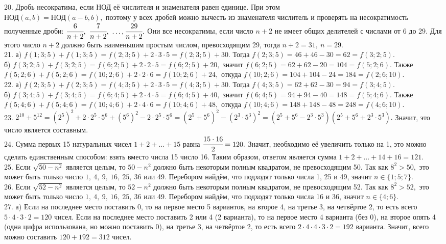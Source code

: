 20. Дробь несократима, если НОД её числителя и знаменателя равен единице. При этом\\ НОД$(a,b)=$НОД$(a-b,b),$ поэтому у всех дробей можно вычесть из знаменателя числитель и проверять на несократимость полученные дроби: $\cfrac{6}{n+2},\ \cfrac{7}{n+2},\ \ldots, \cfrac{29}{n+2}.$ Они все несократимы, если число $n+2$ не имеет общих делителей с числами от 6 до 29. Для этого число $n+2$ должно быть наименьшим простым числом, превосходящим 29, тогда $n+2=31,\ n=29.$\\
21. а) $f(1;3;5)+f(1;3;5)=f(2;3;5)+2\cdot3\cdot5=f(2;3;5)+30.$ Тогда $f(2;3;5)=46+46-30=62=f(3;2;5).$\\
б) $f(3;2;5)+f(3;2;5)=f(6;2;5)+2\cdot2\cdot5=f(6;2;5)+20,$ значит $f(6;2;5)=62+62-20=104=f(5;2;6).$ Также
$f(5;2;6)+f(5;2;6)=f(10;2;6)+2\cdot2\cdot6=f(10;2;6)+24,$ откуда $f(10;2;6)=104+104-24=184=f(2;6;10).$\\
22. а) $f(2;3;5)+f(2;3;5)=f(4;3;5)+2\cdot3\cdot5=f(4;3;5)+30.$ Тогда $f(4;3;5)=62+62-30=94=f(3;4;5).$\\
б) $f(3;4;5)+f(3;4;5)=f(6;4;5)+2\cdot4\cdot5=f(6;4;5)+40,$ значит $f(6;4;5)=94+94-40=148=f(5;4;6).$ Также
$f(5;4;6)+f(5;4;6)=f(10;4;6)+2\cdot4\cdot6=f(10;4;6)+48,$ откуда $f(10;4;6)=148+148-48=248=f(4;6;10).$\\
23. $2^{10}+5^{12}=(2^5)^2+2\cdot2^5\cdot5^6+(5^6)^2-2\cdot2^5\cdot5^6=(2^5+5^6)^2-(2^3\cdot5^3)^2=
(2^5+5^6-2^3\cdot5^3)(2^5+5^6+2^3\cdot5^3).$ Значит, это число является составным.\\
24. Сумма первых 15 натуральных чисел $1+2+\ldots+15$ равна $\cfrac{15\cdot16}{2}=120.$ Значит, необходимо её увеличить только на 1, это можно сделать единственным способом: взять вместо числа 15 число 16. Таким образом, ответом является сумма $1+2+\ldots+14+16=121.$\\
25. Если $\sqrt{50-n^2}$ является целым, то $50-n^2$ должно быть некоторым полным квадратом, не превосходящим 50. Так как $8^2>50,$ это может быть только число $1,\ 4,\ 9,\ 16,\ 25,\ 36$ или 49. Перебором найдём, что подходят только числа 1, 25 и 49, значит $n\in\{1;5;7\}.$\\
26. Если $\sqrt{52-n^2}$ является целым, то $52-n^2$ должно быть некоторым полным квадратом, не превосходящим 52. Так как $8^2>52,$ это может быть только число $1,\ 4,\ 9,\ 16,\ 25,\ 36$ или 49. Перебором найдём, что подходят только числа 16 и 36, значит $n\in\{4;6\}.$\\
27. а) Если на последнее место поставить 0, то на первое место 5 вариантов, на второе 4, на третье 3, на четвёртое 2, то есть всего $5\cdot4\cdot3\cdot2=120$ чисел. Если на последнее место поставить 2 или 4 (2 варианта), то на первое место 4 варианта (без 0), на второе опять 4 (одна цифра использована, но можно поставить 0), на третье 3, на четвёртое 2, то есть всего $2\cdot4\cdot4\cdot3\cdot2=192$ варианта. Значит, всего можно составить $120+192=312$ чисел.\\
